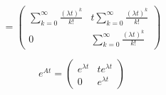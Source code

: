 \begin{itemize}
    $$= \begin{pmatrix}
    \displaystyle \sum_{k=0}^{\infty} \frac{(\lambda t)^k}{k!} & t \displaystyle \sum_{k=0}^{\infty} \frac{(\lambda t)^k}{k!}\\
    0 & \displaystyle \sum_{k=0}^{\infty} \frac{(\lambda t)^k}{k!}
    \end{pmatrix}$$
    
    $$e^{At}= \begin{pmatrix}
    e^{\lambda t} & t e^{\lambda t}\\
    0 & e^{\lambda t}
    \end{pmatrix}$$
    
\end{itemize}
